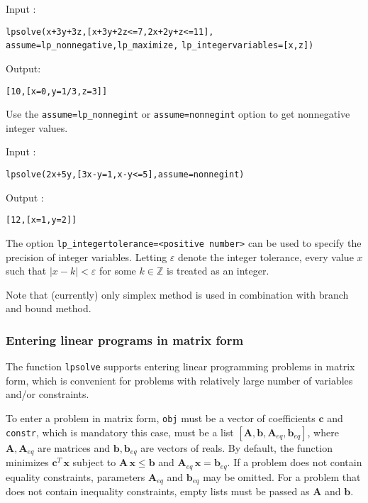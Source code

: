 \documentclass[a4paper,11pt]{book}
\begin{document}
\noindent Input :
\begin{center}
{\tt lpsolve(x+3y+3z,[x+3y+2z<=7,2x+2y+z<=11],}\\
{\tt assume=lp\_nonnegative,lp\_maximize,}
{\tt lp\_integervariables=[x,z])}
\end{center}
Output:
\begin{center}
{\tt [10,[x=0,y=1/3,z=3]]}
\end{center}

Use the {\tt assume=lp\_nonnegint} or {\tt assume=nonnegint} option to get nonnegative integer values.

\noindent Input :
\begin{center}
{\tt lpsolve(2x+5y,[3x-y=1,x-y<=5],assume=nonnegint)}
\end{center}
Output :
\begin{center}
{\tt [12,[x=1,y=2]]}
\end{center}

The option {\tt lp\_integertolerance=<positive number>} can be used to specify the precision of integer variables. Letting $ \varepsilon $ denote the integer tolerance, every value $ x $ such that $ |x-k|<\varepsilon $ for some $ k\in\mathbb{Z} $ is treated as an integer.

Note that (currently) only simplex method is used in combination with branch and bound method.

\subsubsection{Entering linear programs in matrix form}
The function {\tt lpsolve} supports entering linear programming problems in matrix form, which is convenient for problems with relatively large number of variables and/or constraints.

To enter a problem in matrix form, {\tt obj} must be a vector of coefficients $ \mathbf{c} $ 
and {\tt constr}, which is mandatory this case, must be a list $ [\mathbf{A},\mathbf{b},\mathbf{A}_{eq},\mathbf{b}_{eq}] $, where $ \mathbf{A},\mathbf{A}_{eq} $ are matrices and $ \mathbf{b},\mathbf{b}_{eq} $ are vectors of reals. By default, the function minimizes $ \mathbf{c}^T\,\mathbf{x} $ subject to $ \mathbf{A}\,\mathbf{x}\leq\mathbf{b} $ and $ \mathbf{A}_{eq}\,\mathbf{x}=\mathbf{b}_{eq} $. If a problem does not contain equality constraints, parameters $ \mathbf{A}_{eq} $ and $ \mathbf{b}_{eq} $ may be omitted. For a problem that does not contain inequality constraints, empty lists must be passed as $ \mathbf{A} $ and $ \mathbf{b} $.
\end{document}
